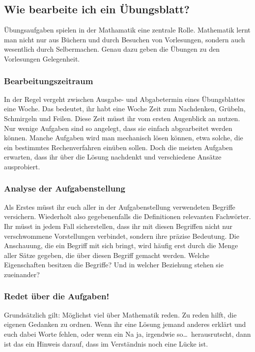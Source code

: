 \subsection{Wie bearbeite ich ein Übungsblatt?}

Übungsaufgaben spielen in der Mathamatik eine zentrale Rolle. Mathematik lernt
man nicht nur aus Büchern und durch Besuchen von Vorlesungen, sondern auch
wesentlich durch Selbermachen. Genau dazu geben die Übungen zu den Vorlesungen
Gelegenheit.

\subsubsection{Bearbeitungszeitraum}

In der Regel vergeht zwischen Ausgabe- und Abgabetermin eines Übungsblattes
eine Woche. Das bedeutet, ihr habt eine Woche Zeit zum Nachdenken, Grübeln,
Schmirgeln und Feilen. Diese Zeit müsst ihr vom ersten Augenblick an nutzen.
Nur wenige Aufgaben sind so angelegt, dass sie einfach abgearbeitet werden
können. Manche Aufgaben wird man mechanisch lösen können, etwa solche, die ein
bestimmtes Rechenverfahren einüben sollen. Doch die meisten Aufgaben erwarten,
dass ihr über die Lösung nachdenkt und verschiedene Ansätze ausprobiert.

\subsubsection{Analyse der Aufgabenstellung}

Als Erstes müsst ihr euch aller in der Aufgabenstellung verwendeten Begriffe
versichern. Wiederholt also gegebenenfalls die Definitionen relevanten
Fachwörter. Ihr müsst in jedem Fall sicherstellen, dass ihr mit diesen
Begriffen nicht nur verschwommene Vorstellungen verbindet, sondern ihre präzise
Bedeutung. Die Anschauung, die ein Begriff mit sich bringt, wird häufig erst
durch die Menge aller Sätze gegeben, die über diesen Begriff gemacht werden.
Welche Eigenschaften besitzen die Begriffe? Und in welcher Beziehung stehen sie
zueinander?

\subsubsection{Redet über die Aufgaben!}

Grundsätzlich gilt: Möglichst viel über Mathematik reden. Zu reden hilft, die
eigenen Gedanken zu ordnen. Wenn ihr eine Lösung jemand anderes erklärt und
euch dabei Worte fehlen, oder wenn ein \glqq Na ja, irgendwie so\dots\grqq\
herausrutscht, dann ist das ein Hinweis darauf, dass im Verständnis noch eine
Lücke ist.

